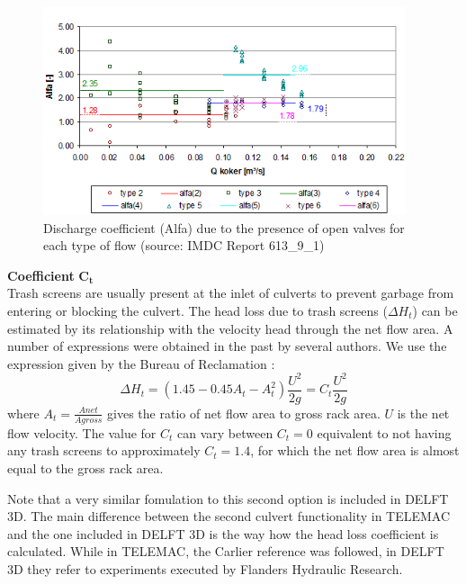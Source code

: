 \begin{figure}[H]
\begin{center}
  \includegraphics[width=0.95\textwidth]{graphics/culvert_fig8.png}
\end{center}
\caption{Discharge coefficient (Alfa) due to the presence of open valves for
each type of flow (source: IMDC Report 613\_9\_1)}
\label{fig:culvert_fig8}
\end{figure}

\textbf{Coefficient} $\mathbf{C_t}$\\

Trash screens are usually present at the inlet of culverts to prevent garbage
from entering or blocking the culvert. The head loss due to trash screens
($\Delta H_t$) can be estimated by its relationship with the velocity
head through the net flow area.
A number of expressions were obtained in the past by several authors.
We use the expression given by the Bureau of Reclamation \cite{Bureau1992}:
\begin{equation}
\Delta H_t = (1.45-0.45A_t-A_t^2)\dfrac{U^2}{2g} = C_t \dfrac{U^2}{2g}
\end{equation}
where $A_t=\frac{Anet}{Agross}$ gives the ratio of net flow area to gross rack area.
$U$ is the net flow velocity. The value for $C_t$ can vary between $C_t= 0$ equivalent
to not having any trash screens to approximately $C_t= 1.4$, for which the net
flow area is almost equal to the gross rack area.

Note that a very similar fomulation to this second option is included in DELFT 3D.
The main difference between the second culvert functionality in TELEMAC and the one
included in DELFT 3D is the way how the head loss coefficient is calculated.
While in TELEMAC, the Carlier reference \cite{Carlier1972} was followed, in DELFT 3D they refer
to experiments executed by Flanders Hydraulic Research.

